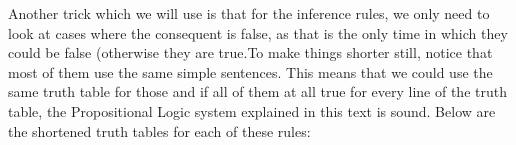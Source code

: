 
Another trick which we will use is that for the inference rules, we only need to look at cases where the consequent is false, as that is the only time in which they could be false (otherwise they are true.To make things shorter still, notice that most of them use the same simple sentences. This means that we could use the same truth table for those and if all of them at all true for every line of the truth table, the Propositional Logic system explained in this text is sound. Below are the shortened truth tables for each of these rules:

